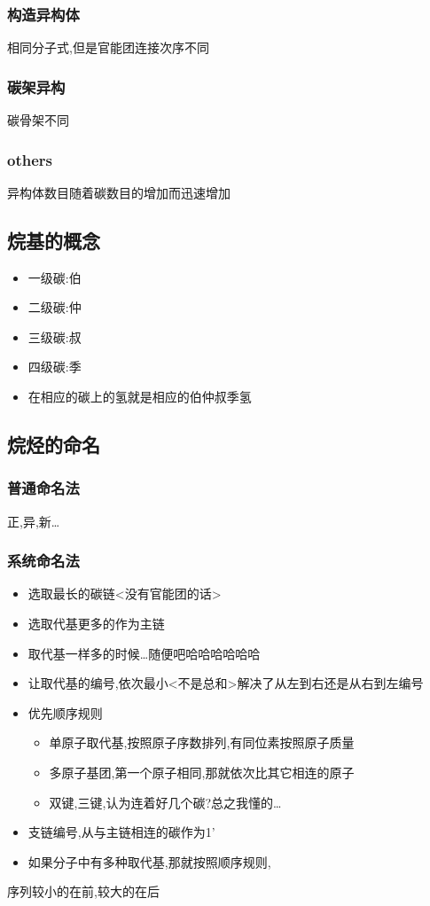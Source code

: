 \documentclass[11pt]{article}
\begin{document}
\subsubsection{构造异构体}
\label{sec:org14967da}
相同分子式,但是官能团连接次序不同
\subsubsection{碳架异构}
\label{sec:orge32dfbf}
碳骨架不同
\subsubsection{others}
\label{sec:org0e5e1b5}
异构体数目随着碳数目的增加而迅速增加
\subsection{烷基的概念}
\label{sec:orgb8df238}
\begin{itemize}
\item 一级碳:伯
\item 二级碳:仲
\item 三级碳:叔
\item 四级碳:季
\item 在相应的碳上的氢就是相应的伯仲叔季氢
\end{itemize}
\subsection{烷烃的命名}
\label{sec:orgb41e59e}
\subsubsection{普通命名法}
\label{sec:org34644d5}
正,异,新\ldots{}
\subsubsection{系统命名法}
\label{sec:org7bde0de}
\begin{itemize}
\item 选取最长的碳链<没有官能团的话>
\item 选取代基更多的作为主链
\item 取代基一样多的时候\ldots{}随便吧哈哈哈哈哈哈
\item 让取代基的编号,依次最小<不是总和>解决了从左到右还是从右到左编号
\item 优先顺序规则
\begin{itemize}
\item 单原子取代基,按照原子序数排列,有同位素按照原子质量
\item 多原子基团,第一个原子相同,那就依次比其它相连的原子
\item 双键,三键,认为连着好几个碳?总之我懂的\ldots{}
\end{itemize}
\item 支链编号,从与主链相连的碳作为1'
\item 如果分子中有多种取代基,那就按照顺序规则,
\end{itemize}
序列较小的在前,较大的在后
\end{document}
